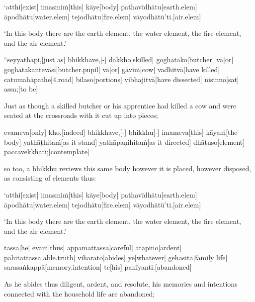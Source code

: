 \begin{samepage}
\begingl[glneveryline={\PaliGlossA,\PaliGlossB}]
‘atthi[exist] imasmiṁ[this] kāye[body] pathavīdhātu[earth.elem] āpodhātu[water.elem] tejodhātu[fire.elem] vāyodhātū’ti.[air.elem]
\endgl
\nopagebreak
\linespread{0.5}
\begin{spacin}{0.2}
{\PaliGlossFT ‘In this body there are the earth element, the water element, the fire element, and the air element.’}
\end{spacin}
\vskip 12pt
\end{samepage}
\begin{samepage}
\begingl[glneveryline={\PaliGlossA,\PaliGlossB}]
“seyyathāpi,[just as] bhikkhave,[-] dakkho[skilled] goghātako[butcher] vā[or] goghātakantevāsī[butcher.pupil] vā[or] gāviṁ[cow] vadhitvā[have killed] catumahāpathe[4.road] bilaso[portions] vibhajitvā[have dissected] nisinno[sat] assa;[to be]
\endgl
\nopagebreak
\linespread{0.5}
\begin{spacin}{0.2}
{\PaliGlossFT Just as though a skilled butcher or his apprentice had killed a cow and were seated at the crossroads with it cut up into pieces;}
\end{spacin}
\vskip 12pt
\end{samepage}
\begin{samepage}
\begingl[glneveryline={\PaliGlossA,\PaliGlossB}]
evameva[only] kho,[indeed] bhikkhave,[-] bhikkhu[-] imameva[this] kāyaṁ[the body] yathāṭhitaṁ[as it stand] yathāpaṇihitaṁ[as it directed] dhātuso[element] paccavekkhati;[contemplate]
\endgl
\nopagebreak
\linespread{0.5}
\begin{spacin}{0.2}
{\PaliGlossFT so too, a bhikkhu reviews this same body however it is placed, however disposed, as consisting of elements thus:}
\end{spacin}
\vskip 12pt
\end{samepage}
\begin{samepage}
\begingl[glneveryline={\PaliGlossA,\PaliGlossB}]
‘atthi[exist] imasmiṁ[this] kāye[body] pathavīdhātu[earth.elem] āpodhātu[water.elem] tejodhātu[fire.elem] vāyodhātū’ti.[air.elem]
\endgl
\nopagebreak
\linespread{0.5}
\begin{spacin}{0.2}
{\PaliGlossFT ‘In this body there are the earth element, the water element, the fire element, and the air element.’}
\end{spacin}
\vskip 12pt
\end{samepage}
\begin{samepage}
\begingl[glneveryline={\PaliGlossA,\PaliGlossB}]
tassa[he] evaṁ[thus] appamattassa[careful] ātāpino[ardent] pahitattassa[able.truth] viharato[abides] ye[whatever] gehasitā[family life] sarasaṅkappā[memory.intention] te[his] pahīyanti.[abandoned]
\endgl
\nopagebreak
\linespread{0.5}
\begin{spacin}{0.2}
{\PaliGlossFT As he abides thus diligent, ardent, and resolute, his memories and intentions connected with the household life are abandoned;}
\end{spacin}
\vskip 12pt
\end{samepage}
